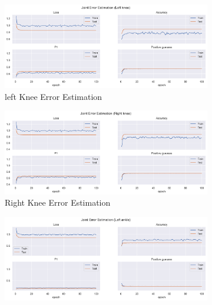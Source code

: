 \begin{figure}[!ht]
  \centering
  \begin{subfigure}[b]{0.47\linewidth}
      \centering
      \includegraphics[width=\textwidth]{figures/Results/v1_bs_60_is_64_e_100/jt/Left knee_ErrorEstimation.png}
      \caption{left Knee Error Estimation}
      \label{fig:v1_lekn_jt_ee}
  \end{subfigure}
  \hfill
  \begin{subfigure}[b]{0.47\linewidth}
      \centering
      \includegraphics[width=\textwidth]{figures/Results/v1_bs_60_is_64_e_100/jt/Right knee_ErrorEstimation.png}
      \caption{Right Knee Error Estimation}
      \label{fig:v1_rikn_jt_ee}
  \end{subfigure}
  \hfill
  \begin{subfigure}[b]{0.47\linewidth}
      \centering
      \includegraphics[width=\textwidth]{figures/Results/v1_bs_60_is_64_e_100/jt/Left ankle_ErrorEstimation.png}

\end{subfigure}
\end{figure}
